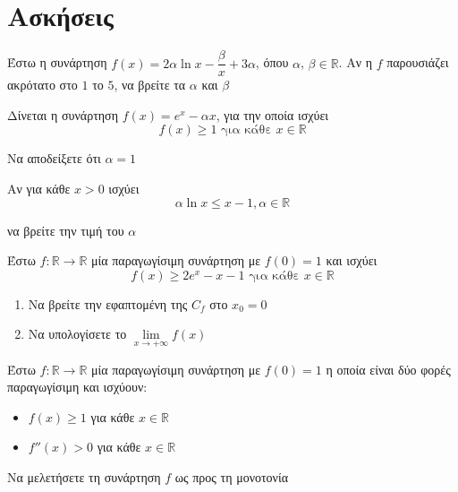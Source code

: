 \documentclass{presentation}
\begin{document}
\section{Ασκήσεις}
\begin{askisi}
  Έστω η συνάρτηση $f(x)=2α\ln x-\dfrac{β}{x}+3α$, όπου $α$, $β\in\mathbb{R}$. Αν η $f$ παρουσιάζει ακρότατο στο $1$ το $5$, να βρείτε τα $α$ και $β$

\end{askisi}

\begin{askisi}
  Δίνεται η συνάρτηση $f(x)=e^x-αx$, για την οποία ισχύει
  $$f(x)\ge 1 \text{ για κάθε } x\in\mathbb{R}$$

  Να αποδείξετε ότι $α=1$

\end{askisi}

\begin{askisi}
  Αν για κάθε $x>0$ ισχύει
  $$α\ln x\le x-1,α\in\mathbb{R}$$

  να βρείτε την τιμή του $α$

\end{askisi}

\begin{askisi}
  Έστω $f:\mathbb{R}\to\mathbb{R}$ μία παραγωγίσιμη συνάρτηση με $f(0)=1$ και ισχύει
  $$f(x)\ge 2e^x-x-1 \text{ για κάθε } x\in\mathbb{R}$$
  \begin{enumerate}
    \item<1-> Να βρείτε την εφαπτομένη της $C_f$ στο $x_0=0$
    \item<2-> Να υπολογίσετε το $\lim\limits_{x \to +\infty}{ f(x) }$
  \end{enumerate}

\end{askisi}

\begin{askisi}
  Έστω $f:\mathbb{R}\to\mathbb{R}$ μία παραγωγίσιμη συνάρτηση με $f(0)=1$ η οποία είναι δύο φορές παραγωγίσιμη και ισχύουν:
  \begin{itemize}
    \item $f(x)\ge 1$ για κάθε $x\in\mathbb{R}$
    \item $f''(x)>0 $ για κάθε $x\in\mathbb{R}$
  \end{itemize}
  Να μελετήσετε τη συνάρτηση $f$ ως προς τη μονοτονία


\end{askisi}
\end{document}

